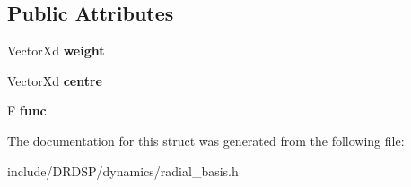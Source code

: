 \subsection*{Public Attributes}
\begin{DoxyCompactItemize}
\item 
\hypertarget{struct_d_r_d_s_p_1_1_r_b_f_a2d46e96d11e49da8ec3e26a9599c7fcd}{Vector\-Xd {\bfseries weight}}\label{struct_d_r_d_s_p_1_1_r_b_f_a2d46e96d11e49da8ec3e26a9599c7fcd}

\item 
\hypertarget{struct_d_r_d_s_p_1_1_r_b_f_ae5e66e28a34f5091aa31fbcb2ba9b14d}{Vector\-Xd {\bfseries centre}}\label{struct_d_r_d_s_p_1_1_r_b_f_ae5e66e28a34f5091aa31fbcb2ba9b14d}

\item 
\hypertarget{struct_d_r_d_s_p_1_1_r_b_f_ae82f9a1e47f6203e58b62864fa85288a}{F {\bfseries func}}\label{struct_d_r_d_s_p_1_1_r_b_f_ae82f9a1e47f6203e58b62864fa85288a}

\end{DoxyCompactItemize}


The documentation for this struct was generated from the following file\-:\begin{DoxyCompactItemize}
\item 
include/\-D\-R\-D\-S\-P/dynamics/radial\-\_\-basis.\-h\end{DoxyCompactItemize}
